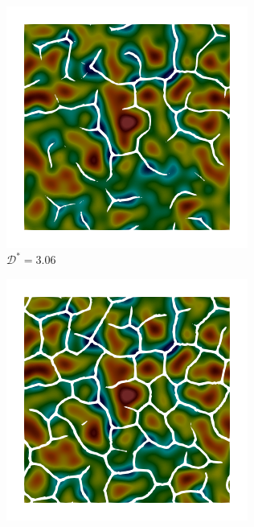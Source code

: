 \begin{figure}[!htbp]
  \centering
  \begin{subfigure}[b]{0.25\textwidth}
    \includegraphics[width=\textwidth]{Chapter4/figures/2D/Gc_sqexp_cartesian_5_5_rho_0_seed_a_with_crack_140.png}
    \caption{$\mathcal{D}^* = 3.06$}
    \label{fig: Chapter4/2D/Gc_sqexp_cartesian_5_5_rho_0_seed_a_with_crack_140}
  \end{subfigure}
  \begin{subfigure}[b]{0.25\textwidth}
    \includegraphics[width=\textwidth]{Chapter4/figures/2D/Gc_sqexp_cartesian_5_5_rho_0_seed_a_with_crack_160.png}

\end{subfigure}
\end{figure}
